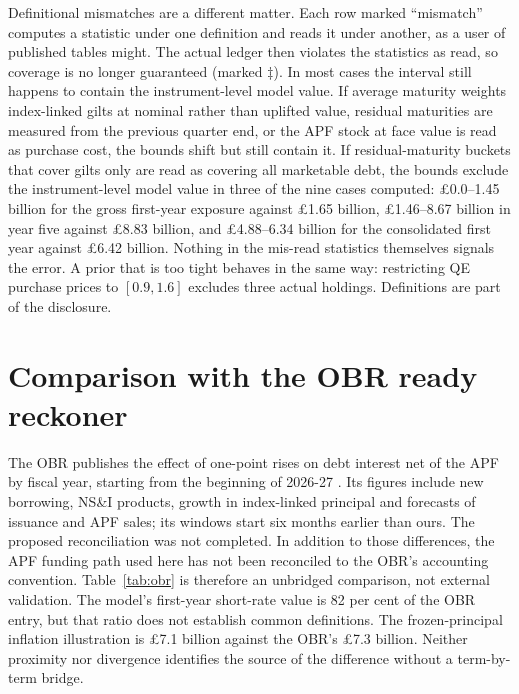 \documentclass[11pt,a4paper]{article}
\theoremstyle{remark}
\begin{document}
Definitional mismatches are a different matter. Each row marked ``mismatch'' computes a statistic under one definition and reads it under another, as a user of published tables might. The actual ledger then violates the statistics as read, so coverage is no longer guaranteed (marked $\ddagger$). In most cases the interval still happens to contain the instrument-level model value. If average maturity weights index-linked gilts at nominal rather than uplifted value, residual maturities are measured from the previous quarter end, or the APF stock at face value is read as purchase cost, the bounds shift but still contain it. If residual-maturity buckets that cover gilts only are read as covering all marketable debt, the bounds exclude the instrument-level model value in three of the nine cases computed: £0.0--1.45 billion for the gross first-year exposure against £1.65 billion, £1.46--8.67 billion in year five against £8.83 billion, and £4.88--6.34 billion for the consolidated first year against £6.42 billion. Nothing in the mis-read statistics themselves signals the error. A prior that is too tight behaves in the same way: restricting QE purchase prices to $[0.9,1.6]$ excludes three actual holdings. Definitions are part of the disclosure.

\begin{table}[t]\centering\small
\caption{Robustness. Identified intervals, £ billion. $\ddagger$: the actual ledger violates a statistic or prior as read, so coverage is not guaranteed; $\dagger$: the interval excludes the instrument-level value. For the first-pass financing approximation row the instrument-level value under that estimand is in parentheses. Dashes mark variants that do not apply.}\label{tab:robust}
\resizebox{\textwidth}{!}{}
\end{table}

\section{Comparison with the OBR ready reckoner}\label{sec:obr}

The OBR publishes the effect of one-point rises on debt interest net of the APF by fiscal year, starting from the beginning of 2026-27 \citep{OBR2026}. Its figures include new borrowing, NS\&I products, growth in index-linked principal and forecasts of issuance and APF sales; its windows start six months earlier than ours. The proposed reconciliation was not completed. In addition to those differences, the APF funding path used here has not been reconciled to the OBR's accounting convention. Table~\ref{tab:obr} is therefore an unbridged comparison, not external validation. The model's first-year short-rate value is 82 per cent of the OBR entry, but that ratio does not establish common definitions. The frozen-principal inflation illustration is £7.1 billion against the OBR's £7.3 billion. Neither proximity nor divergence identifies the source of the difference without a term-by-term bridge.
\end{document}
